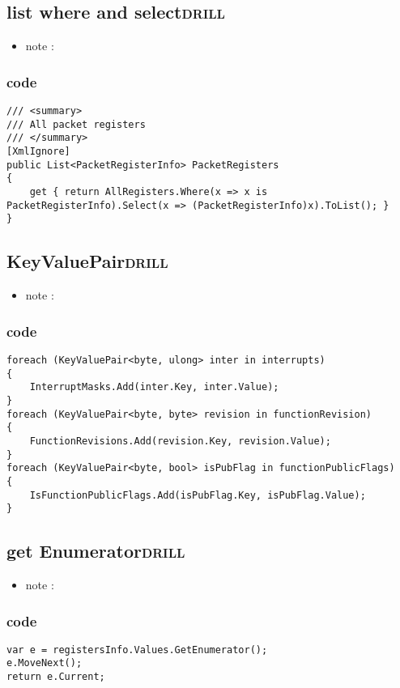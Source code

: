 \documentclass[11pt]{article}
\begin{document}
\subsection{list where and select\hfill{}\textsc{drill}}
\label{sec:org58cf0ac}
\begin{itemize}
\item note :
\end{itemize}
\subsubsection{code}
\label{sec:org9fdfe5c}
\begin{verbatim}
/// <summary>
/// All packet registers
/// </summary>
[XmlIgnore]
public List<PacketRegisterInfo> PacketRegisters
{
    get { return AllRegisters.Where(x => x is PacketRegisterInfo).Select(x => (PacketRegisterInfo)x).ToList(); }
}

\end{verbatim}

\subsection{KeyValuePair\hfill{}\textsc{drill}}
\label{sec:org0ee50df}
\begin{itemize}
\item note :
\end{itemize}
\subsubsection{code}
\label{sec:org89800a9}
\begin{verbatim}
foreach (KeyValuePair<byte, ulong> inter in interrupts)
{
    InterruptMasks.Add(inter.Key, inter.Value);
}
foreach (KeyValuePair<byte, byte> revision in functionRevision)
{
    FunctionRevisions.Add(revision.Key, revision.Value);
}
foreach (KeyValuePair<byte, bool> isPubFlag in functionPublicFlags)
{
    IsFunctionPublicFlags.Add(isPubFlag.Key, isPubFlag.Value);
}

\end{verbatim}

\subsection{get Enumerator\hfill{}\textsc{drill}}
\label{sec:org364c02a}
\begin{itemize}
\item note :
\end{itemize}
\subsubsection{code}
\label{sec:orgc338452}
\begin{verbatim}
var e = registersInfo.Values.GetEnumerator();
e.MoveNext();
return e.Current;

\end{verbatim}
\end{document}
